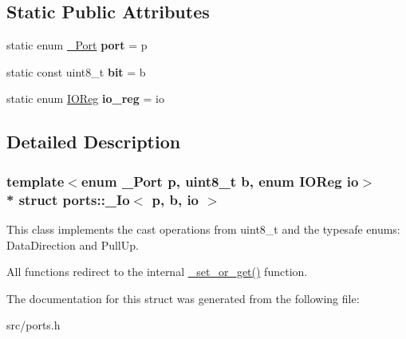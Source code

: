 \subsection*{Static Public Attributes}
\begin{DoxyCompactItemize}
\item 
static enum \hyperlink{namespaceports_a9949317f344930bd6ad1097e80c97b67}{\+\_\+\+Port} {\bfseries port} = p\hypertarget{structports_1_1__Io_adad70155dd6893a33058c00b39a61868}{}\label{structports_1_1__Io_adad70155dd6893a33058c00b39a61868}

\item 
static const uint8\+\_\+t {\bfseries bit} = b\hypertarget{structports_1_1__Io_ab6ad4e5dabbb7a274ef5299a9bdb094f}{}\label{structports_1_1__Io_ab6ad4e5dabbb7a274ef5299a9bdb094f}

\item 
static enum \hyperlink{namespaceports_aca1f1af9f1af73e71c6954b7dfb1bfa1}{I\+O\+Reg} {\bfseries io\+\_\+reg} = io\hypertarget{structports_1_1__Io_acdb506a481ed44079a6fff95374b5852}{}\label{structports_1_1__Io_acdb506a481ed44079a6fff95374b5852}

\end{DoxyCompactItemize}


\subsection{Detailed Description}
\subsubsection*{template$<$enum \+\_\+\+Port p, uint8\+\_\+t b, enum I\+O\+Reg io$>$\\*
struct ports\+::\+\_\+\+Io$<$ p, b, io $>$}

This class implements the cast operations from uint8\+\_\+t and the typesafe enums\+: Data\+Direction and Pull\+Up. 

All functions redirect to the internal \hyperlink{namespaceports_aa339a9d178cb414c4cf243450d5887d2}{\+\_\+set\+\_\+or\+\_\+get()} function. 

The documentation for this struct was generated from the following file\+:\begin{DoxyCompactItemize}
\item 
src/ports.\+h\end{DoxyCompactItemize}
